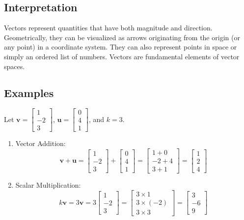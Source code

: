 \documentclass{article}
\newcommand{\vect}[1]{\bm{#1}} %
\begin{document}
\subsection*{Interpretation}
Vectors represent quantities that have both magnitude and direction. Geometrically, they can be visualized as arrows originating from the origin (or any point) in a coordinate system. They can also represent points in space or simply an ordered list of numbers. Vectors are fundamental elements of vector spaces.

\subsection*{Examples}
Let $\vect{v} = \begin{bmatrix} 1 \\ -2 \\ 3 \end{bmatrix}$, $\vect{u} = \begin{bmatrix} 0 \\ 4 \\ 1 \end{bmatrix}$, and $k = 3$.
\begin{enumerate}
    \item Vector Addition:
    \[ \vect{v} + \vect{u} = \begin{bmatrix} 1 \\ -2 \\ 3 \end{bmatrix} + \begin{bmatrix} 0 \\ 4 \\ 1 \end{bmatrix} = \begin{bmatrix} 1+0 \\ -2+4 \\ 3+1 \end{bmatrix} = \begin{bmatrix} 1 \\ 2 \\ 4 \end{bmatrix} \]
    \item Scalar Multiplication:
    \[ k\vect{v} = 3 \vect{v} = 3 \begin{bmatrix} 1 \\ -2 \\ 3 \end{bmatrix} = \begin{bmatrix} 3 \times 1 \\ 3 \times (-2) \\ 3 \times 3 \end{bmatrix} = \begin{bmatrix} 3 \\ -6 \\ 9 \end{bmatrix} \]
\end{enumerate}
\end{document}
